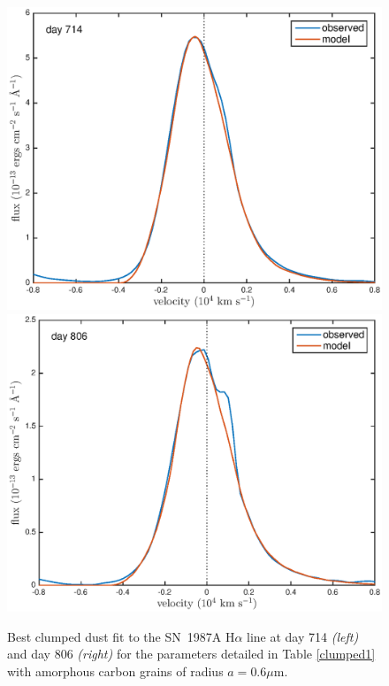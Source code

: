 \documentclass[useAMS,usenatbib,usegraphicx]{mnras}
\begin{document}
 \begin{figure}
\begin{center}
\includegraphics[trim =33 10 45 15,clip=true,scale=0.41]{clump_1/best_fit/d714Ha_new}
\includegraphics[trim =33 10 45 15,clip=true,scale=0.41]{clump_1/best_fit/d806Ha_new}
\caption{Best clumped dust fit to the SN~1987A H$\alpha$ line at day 714 \textit{\textit{(left)}} and day 806 \textit{\textit{(right)}} for the parameters detailed in Table \ref{clumped1} with amorphous carbon grains of radius $a=0.6 \mu$m.}
\label{Ha_clump1}
\end{center}
\end{figure}
\end{document}

